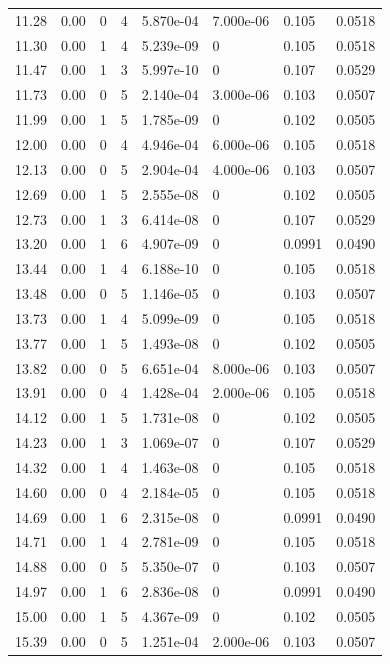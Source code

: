 \documentclass[preview]{standalone}
\begin{document}
{{{\begin{tabular}{L{1.2cm}C{1.2cm} C{0.3cm}C{0.5cm} C{1.4cm}C{1.4cm} C{1.4cm}C{1.4cm}}
  11.28  &  0.00  & 0     &  4 &  5.870e-04  & 7.000e-06  & 0.105 &  0.0518   \\ 
  11.30  &  0.00  & 1     &  4 &  5.239e-09  & 0  & 0.105 &  0.0518   \\ 
  11.47  &  0.00  & 1     &  3 &  5.997e-10  & 0  & 0.107 &  0.0529   \\ 
  11.73  &  0.00  & 0     &  5 &  2.140e-04  & 3.000e-06  & 0.103 &  0.0507   \\ 
  11.99  &  0.00  & 1     &  5 &  1.785e-09  & 0  & 0.102 &  0.0505   \\ 
  12.00  &  0.00  & 0     &  4 &  4.946e-04  & 6.000e-06  & 0.105 &  0.0518   \\ 
  12.13  &  0.00  & 0     &  5 &  2.904e-04  & 4.000e-06  & 0.103 &  0.0507   \\ 
  12.69  &  0.00  & 1     &  5 &  2.555e-08  & 0  & 0.102 &  0.0505   \\ 
  12.73  &  0.00  & 1     &  3 &  6.414e-08  & 0  & 0.107 &  0.0529   \\ 
  13.20  &  0.00  & 1     &  6 &  4.907e-09  & 0  & 0.0991 &  0.0490   \\ 
  13.44  &  0.00  & 1     &  4 &  6.188e-10  & 0  & 0.105 &  0.0518   \\ 
  13.48  &  0.00  & 0     &  5 &  1.146e-05  & 0  & 0.103 &  0.0507   \\ 
  13.73  &  0.00  & 1     &  4 &  5.099e-09  & 0  & 0.105 &  0.0518   \\ 
  13.77  &  0.00  & 1     &  5 &  1.493e-08  & 0  & 0.102 &  0.0505   \\ 
  13.82  &  0.00  & 0     &  5 &  6.651e-04  & 8.000e-06  & 0.103 &  0.0507   \\ 
  13.91  &  0.00  & 0     &  4 &  1.428e-04  & 2.000e-06  & 0.105 &  0.0518   \\ 
  14.12  &  0.00  & 1     &  5 &  1.731e-08  & 0  & 0.102 &  0.0505   \\ 
  14.23  &  0.00  & 1     &  3 &  1.069e-07  & 0  & 0.107 &  0.0529   \\ 
  14.32  &  0.00  & 1     &  4 &  1.463e-08  & 0  & 0.105 &  0.0518   \\ 
  14.60  &  0.00  & 0     &  4 &  2.184e-05  & 0  & 0.105 &  0.0518   \\ 
  14.69  &  0.00  & 1     &  6 &  2.315e-08  & 0  & 0.0991 &  0.0490   \\ 
  14.71  &  0.00  & 1     &  4 &  2.781e-09  & 0  & 0.105 &  0.0518   \\ 
  14.88  &  0.00  & 0     &  5 &  5.350e-07  & 0  & 0.103 &  0.0507   \\ 
  14.97  &  0.00  & 1     &  6 &  2.836e-08  & 0  & 0.0991 &  0.0490   \\ 
  15.00  &  0.00  & 1     &  5 &  4.367e-09  & 0  & 0.102 &  0.0505   \\ 
  15.39  &  0.00  & 0     &  5 &  1.251e-04  & 2.000e-06  & 0.103 &  0.0507   \\ 
\hline 
\end{tabular} 

}}}
\end{document}

